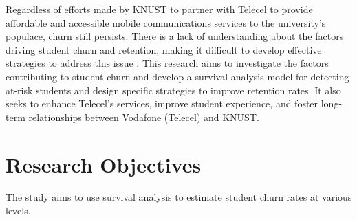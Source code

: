 \documentclass[doublespacing]{report} %
\begin{document}
Regardless of efforts made by KNUST to partner with Telecel to provide affordable and accessible mobile communications services to the university’s populace, churn still persists. There is a lack of understanding about the factors driving student churn and retention, making it difficult to develop effective strategies to address this issue \cite{kapur2018}. This research aims to investigate the factors contributing to student churn and develop a survival analysis model for detecting at-risk students and design specific strategies to improve retention rates. It also seeks to enhance Telecel’s services, improve student experience, and foster long-term relationships between Vodafone (Telecel) and KNUST.

\section{Research Objectives}

The study aims to use survival analysis to estimate student churn rates at various levels.
%	
\end{document}
